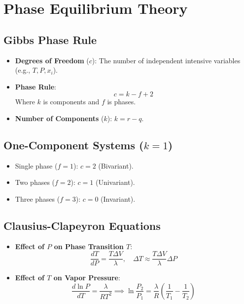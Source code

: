 \section{Phase Equilibrium Theory}

\subsection{Gibbs Phase Rule}
\begin{itemize}
    \item \textbf{Degrees of Freedom} ($c$): The number of independent intensive variables (e.g., $T, P, x_i$).
    \item \textbf{Phase Rule}: 
    \begin{equation}
        c = k - f + 2
    \end{equation}
    Where $k$ is components and $f$ is phases.
    \item \textbf{Number of Components} ($k$): $k = r - q$.
\end{itemize}

\subsection{One-Component Systems ($k=1$)}
\begin{itemize}
    \item Single phase ($f=1$): $c = 2$ (Bivariant).
    \item Two phases ($f=2$): $c = 1$ (Univariant).
    \item Three phases ($f=3$): $c = 0$ (Invariant).
\end{itemize}

\subsection{Clausius-Clapeyron Equations}
\begin{itemize}
    \item \textbf{Effect of $P$ on Phase Transition $T$}:
    \begin{equation}
        \frac{dT}{dP} = \frac{T \Delta V}{\lambda}, \quad \Delta T \approx \frac{T \Delta V}{\lambda} \Delta P
    \end{equation}
    \item \textbf{Effect of $T$ on Vapor Pressure}: 
    \begin{equation}
        \frac{d \ln P}{dT} = \frac{\lambda}{RT^2} \implies \ln \frac{P_2}{P_1} = \frac{\lambda}{R} \left( \frac{1}{T_1} - \frac{1}{T_2} \right)
    \end{equation}
\end{itemize}

